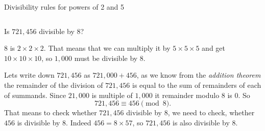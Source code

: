 \documentclass[9pt,aspectratio=169]{beamer}
\begin{document}
\begin{frame}{Divisibility rules for powers of 2 and 5}
  \begin{columns}[T]
    \begin{column}{0.5\textwidth}
      \begin{problem}
        Is $721{,}456$ divisible by $8$?
      \end{problem}
      $8$ is $2 \times 2 \times 2$. That means that we can multiply it by $5 \times 5 \times 5$ and get $10 \times 10 \times 10$, so $1,000$ must be divisible by $8$.

      Lets write down $721{,}456$ as $721{,}000 + 456$, as we know from the \emph{addition theorem} the remainder of the division of $721{,}456$ is equal to the sum of remainders of each of summands. Since $21{,}000$ is multiple of $1{,}000$ it remainder modulo $8$ is $0$. So 
      \[ 721{,}456 \equiv 456 \pmod{8}. \]
      That means to check whether $721{,}456$ divisible by $8$, we need to check, whether $456$ is divisible by $8$. Indeed $456 = 8 \times 57$, so $721{,}456$ is also divisible by $8$.\medskip
      

\end{column}
\end{columns}
\end{frame}
\end{document}

